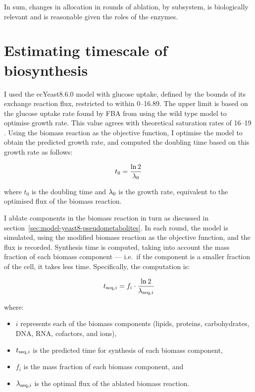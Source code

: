 In sum, changes in allocation in rounds of ablation, by subsystem, is biologically relevant and is reasonable given the roles of the enzymes.


\section{Estimating timescale of biosynthesis}
\label{sec:model-timescale}

I used the ecYeast8.6.0 model with glucose uptake, defined by the bounds of its exchange reaction flux, restricted to within \SIrange{0}{16.89}{\mmolgdw}.
The upper limit is based on the glucose uptake rate found by FBA from using the wild type model to optimise growth rate.
This value agrees with theoretical saturation rates of \SIrange{16}{19}{\mmolgdw} \parencite{blankTCACycleActivity2004}.
Using the biomass reaction as the objective function, I optimise the model to obtain the predicted growth rate, and computed the doubling time based on this growth rate as follows:

\begin{equation}
  t_{0} = \frac{\ln 2}{\lambda_{0}}
  \label{eq:model-doubling-time}
\end{equation}

where $t_{0}$ is the doubling time and $\lambda_{0}$ is the growth rate, equivalent to the optimised flux of the biomass reaction.

I ablate components in the biomass reaction in turn as discussed in section~\ref{sec:model-yeast8-pseudometabolites}.
In each round, the model is simulated, using the modified biomass reaction as the objective function, and the flux is recorded.
Synthesis time is computed, taking into account the mass fraction of each biomass component --- i.e.\ if the component is a smaller fraction of the cell, it takes less time.
Specifically, the computation is:

\begin{equation}
  t_{\mathrm{seq},i} = f_{i} \cdot \frac{\ln 2}{\lambda_{\mathrm{seq},i}}
  \label{eq:model-ablated-time}
\end{equation}

where:
\begin{itemize}
  \item $i$ represents each of the biomass components (lipids, proteins, carbohydrates, DNA, RNA, cofactors, and ions),
  \item $t_{\mathrm{seq},i}$ is the predicted time for synthesis of each biomass component,
  \item $f_{i}$ is the mass fraction of each biomass component, and
  \item $\lambda_{\mathrm{seq},i}$ is the optimal flux of the ablated biomass reaction.
\end{itemize}

